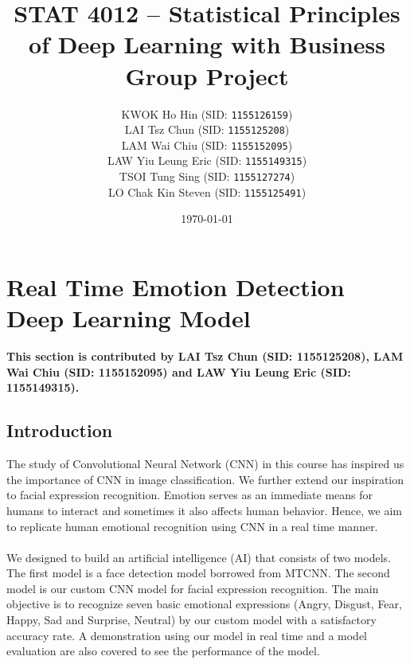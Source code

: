 \documentclass[11pt,a4paper]{article}
\begin{document}
    
    \thispagestyle{empty}
    \title{\textsc{STAT 4012} -- Statistical Principles of Deep Learning with Business \\ Group Project}
    \author{
        KWOK Ho Hin (SID: \texttt{1155126159}) \\
        LAI Tsz Chun (SID: \texttt{1155125208}) \\
        LAM Wai Chiu (SID: \texttt{1155152095}) \\
        LAW Yiu Leung Eric (SID: \texttt{1155149315}) \\
        TSOI Tung Sing (SID: \texttt{1155127274}) \\
        LO Chak Kin Steven (SID: \texttt{1155125491})
    }
    \date{\today}
    \maketitle
    
    \pagestyle{plain} 
    
    \tableofcontents
    \listoffigures
    \listoftables
    
    \newpage
    
    \pagestyle{fancy}
    \setcounter{page}{1}
    
    \section{Real Time Emotion Detection Deep Learning Model}
    \textbf{This section is contributed by LAI Tsz Chun (SID: 1155125208), LAM Wai Chiu (SID: 1155152095) and LAW Yiu Leung Eric (SID: 1155149315).}
    
    \subsection{Introduction}
    The study of Convolutional Neural Network (CNN) in this course has inspired us the importance of CNN in image classification. We further extend our inspiration to facial expression recognition. Emotion serves as an immediate means for humans to interact and sometimes it also affects human behavior. Hence, we aim to replicate human emotional recognition using CNN in a real time manner. \\
    \\
    We designed to build an artificial intelligence (AI) that consists of two models. The first model is a face detection model borrowed from MTCNN. The second model is our custom CNN model for facial expression recognition. The main objective is to recognize seven basic emotional expressions (Angry, Disgust, Fear, Happy, Sad and Surprise, Neutral) by our custom model with a satisfactory accuracy rate. A demonstration using our model in real time and a model evaluation are also covered to see the performance of the model.
\end{document}
